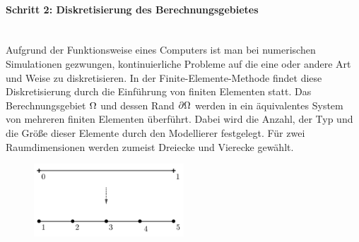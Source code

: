 \documentclass[crop=false]{standalone}
\begin{document}
      \paragraph{Schritt 2: Diskretisierung des Berechnungsgebietes} %
      \label{par:schritt_2_diskretisierung_des_berechnungsgebietes}
        \hfill\\
        Aufgrund der Funktionsweise eines Computers ist man bei numerischen Simulationen gezwungen, kontinuierliche Probleme auf die eine oder andere Art und Weise zu diskretisieren.
        In der Finite-Elemente-Methode findet diese Diskretisierung durch die Einführung von finiten Elementen statt.
        Das Berechnungsgebiet $\Omega$ und dessen Rand $\partial\Omega$ werden in ein äquivalentes System von mehreren finiten Elementen überführt.
        Dabei wird die Anzahl, der Typ und die Größe dieser Elemente durch den Modellierer festgelegt.
        Für zwei Raumdimensionen werden zumeist Dreiecke und Vierecke gewählt.
        \begin{figure}[h]
          \center
          \includegraphics[width=0.5\textwidth]{images/domain_one_dimension_example.pdf}
          \caption{}
          \label{fig:domain-example}
        \end{figure}
\end{document}
